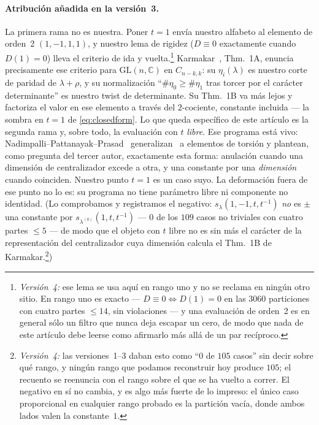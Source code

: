 \documentclass[11pt,a4paper]{article}
\begin{document}
\paragraph{Atribuci\'on a\~nadida en la versi\'on~3.}
La primera rama no es nuestra. Poner $t=1$ env\'ia nuestro alfabeto al elemento de orden~2
$(1,-1,1,1)$, y nuestro lema de rigidez ($D\equiv0$ exactamente cuando $D(1)=0$) lleva el criterio
de ida y vuelta.\footnote{\emph{Versi\'on~4:} ese lema se usa aqu\'i en rango uno y no se reclama
en ning\'un otro sitio. En rango uno es exacto --- $D\equiv0\iff D(1)=0$ en las $3060$ particiones
con cuatro partes $\le14$, sin violaciones --- y una evaluaci\'on de orden~2 es en general s\'olo
un filtro que nunca deja escapar un cero, de modo que nada de este art\'iculo debe leerse como
afirmarlo m\'as all\'a de un par rec\'iproco.} Karmakar~\cite{Karmakar}, Thm.~1A, enuncia precisamente ese criterio para
$\mathrm{GL}(n,\mathbb{C})$ en $C_{n-k,k}$: su $\eta_i(\lambda)$ es nuestro corte de paridad de
$\lambda+\rho$, y su normalizaci\'on ``$\#\eta_0\ge\#\eta_1$ tras torcer por el car\'acter
determinante'' es nuestro twist de determinante. Su Thm.~1B va m\'as lejos y factoriza el valor en
ese elemento a trav\'es del $2$-cociente, constante incluida --- la sombra en $t=1$ de
\eqref{eq:closedform}. Lo que queda espec\'ifico de este art\'iculo es la segunda rama y, sobre
todo, la evaluaci\'on con $t$ \emph{libre}. Ese programa est\'a vivo: Nadimpalli--Pattanayak--Prasad~\cite{NPP}
generalizan~\cite{Karmakar} a elementos de torsi\'on y plantean, como pregunta del tercer autor,
exactamente esta forma: anulaci\'on cuando una dimensi\'on de centralizador excede a otra, y una
constante por una \emph{dimensi\'on} cuando coinciden. Nuestro punto $t=1$ es un caso suyo. La
deformaci\'on fuera de ese punto no lo es: su programa no tiene par\'ametro libre ni componente no
identidad. (Lo comprobamos y registramos el negativo: $s_\lambda(1,-1,t,t^{-1})$ \emph{no} es $\pm$
una constante por $s_{\lambda^{(0)}}(1,t,t^{-1})$ --- $0$ de los $109$ casos no triviales con
cuatro partes $\le5$ --- de modo que el objeto
con $t$ libre no es sin m\'as el car\'acter de la representaci\'on del centralizador cuya dimensi\'on
calcula el Thm.~1B de Karmakar.\footnote{\emph{Versi\'on~4:} las versiones~1--3 daban esto como
``$0$ de $105$ casos'' sin decir sobre qu\'e rango, y ning\'un rango que podamos reconstruir hoy
produce $105$; el recuento se reenuncia con el rango sobre el que se ha vuelto a correr. El
negativo en s\'i no cambia, y es algo m\'as fuerte de lo impreso: el \'unico caso proporcional en
cualquier rango probado es la partici\'on vac\'ia, donde ambos lados valen la constante~$1$.})
\end{document}
